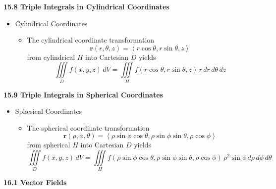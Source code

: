 \documentclass[12pt]{article}
\renewcommand{\vec}[1]{\mathbf{#1}}
\newcommand{\dvar}[1]{\,d{#1}}
\renewcommand{\d}[1]{\dvar{#1}}
\newcommand{\<}{\left<}
\renewcommand{\>}{\right>}
\begin{document}

\underline{\hspace*{6in}}

\centerline{\bf 15.8 Triple Integrals in Cylindrical Coordinates}
  
  \begin{itemize}
  
  \item Cylindrical Coordinates
    \begin{itemize}
    \item The cylindrical coordinate transformation \[\vec{r}(r,\theta,z) = \<r\cos\theta, r\sin\theta, z\>\] from cylindrical $H$ into Cartesian $D$ yields \[\iiint\limits_D f(x,y,z)\d{V} = \iiint\limits_H f(r\cos\theta,r\sin\theta,z)\,r\d{r}\d{\theta}\d{z}\]
    \end{itemize}
      
  
  
  \end{itemize}


\underline{\hspace*{6in}}

\centerline{\bf 15.9 Triple Integrals in Spherical Coordinates}

  \begin{itemize}
  
  \item Spherical Coordinates
    \begin{itemize}
    \item The spherical coordinate transformation \[\vec{r}(\rho,\phi,\theta)=\<\rho\sin\phi\cos\theta, \rho\sin\phi\sin\theta, \rho\cos\phi\>\] from spherical $H$ into Cartesian $D$ yields \[\iiint\limits_D f(x,y,z)\, dV = \iiint\limits_H f(\rho\sin\phi\cos\theta,\rho\sin\phi\sin\theta,\rho\cos\phi) \,\rho^2\sin\phi\dvar{\rho}\dvar{\phi}\dvar{\theta} \]
    \end{itemize}
  \end{itemize}
  
\newpage

\centerline{\bf 16.1 Vector Fields}
\end{document}
